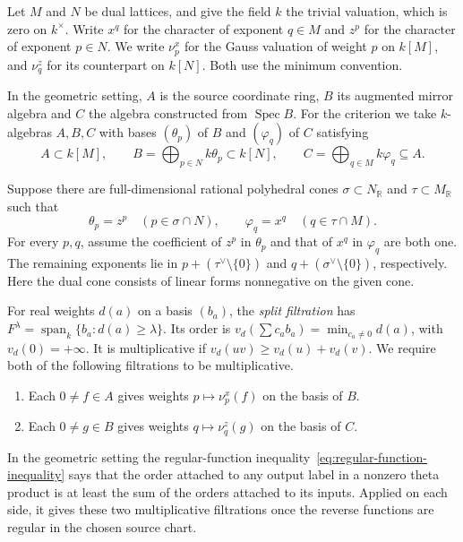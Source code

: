 \documentclass[11pt,reqno]{amsart}
\numberwithin{equation}{section}
\theoremstyle{definition}
\theoremstyle{remark}
\DeclareMathOperator{\Spec}{Spec}
\begin{document}
Let \(M\) and \(N\) be dual lattices, and give the field \(k\) the
trivial valuation, which is zero on \(k^\times\). Write \(x^q\) for the character of exponent
\(q\in M\) and \(z^p\) for the character of exponent \(p\in N\).
We write \(\nu^x_p\) for the Gauss valuation of weight \(p\) on
\(k[M]\), and \(\nu^z_q\) for its counterpart on \(k[N]\).
Both use the minimum convention.

In the geometric setting, \(A\) is the source coordinate ring, \(B\)
its augmented mirror algebra and \(C\) the algebra constructed from
\(\Spec B\). For the criterion we take \(k\)-algebras \(A,B,C\) with
bases \((\theta_p)\) of \(B\) and \((\varphi_q)\) of \(C\) satisfying
\[ A\subset k[M],\qquad B=\bigoplus_{p\in N}k\theta_p\subset k[N],\qquad C=\bigoplus_{q\in M}k\varphi_q\subseteq A . \]

Suppose there are full-dimensional rational polyhedral cones
\(\sigma\subset N_{\mathbb R}\) and \(\tau\subset M_{\mathbb R}\)
such that
\[ \theta_p=z^p\quad(p\in\sigma\cap N),\qquad \varphi_q=x^q\quad(q\in\tau\cap M). \]
For every \(p,q\), assume the coefficient of \(z^p\) in \(\theta_p\)
and that of \(x^q\) in \(\varphi_q\) are both one. The remaining
exponents lie in \(p+(\tau^\vee\setminus\{0\})\) and
\(q+(\sigma^\vee\setminus\{0\})\), respectively. Here the dual cone
consists of linear forms nonnegative on the given cone.

For real weights \(d(a)\) on a basis \((b_a)\), the \emph{split filtration}
has \(F^\lambda=\operatorname{span}_k\{b_a:d(a)\ge\lambda\}\).
Its order is \(v_d(\sum c_ab_a)=\min_{c_a\ne0}d(a)\), with
\(v_d(0)=+\infty\). It is multiplicative if
\(v_d(uv)\ge v_d(u)+v_d(v)\). We require both of the following
filtrations to be multiplicative.
\begin{enumerate}
\item Each \(0\ne f\in A\) gives weights
  \(p\mapsto\nu^x_p(f)\) on the basis of \(B\).
\item Each \(0\ne g\in B\) gives weights
  \(q\mapsto\nu^z_q(g)\) on the basis of \(C\).
\end{enumerate}
In the geometric setting the regular-function inequality~\eqref{eq:regular-function-inequality} says that
the order attached to any output label in a nonzero theta product is
at least the sum of the orders attached to its inputs. Applied on
each side, it gives these two multiplicative filtrations once the
reverse functions are regular in the chosen source chart.
\end{document}
